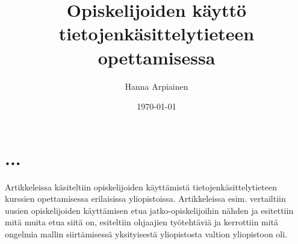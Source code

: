 \documentclass[finnish]{tktltiki2}
\title{﻿Opiskelijoiden käyttö tietojenkäsittelytieteen opettamisessa}
\author{Hanna Arpiainen}
\date{\today}
\theoremstyle{definition}
\theoremstyle{remark}
\begin{document}
\maketitle
\makeabstract

\tableofcontents
\newpage



\section{...}
Artikkeleissa käsiteltiin opiskelijoiden käyttämistä tietojenkäsittelytieteen kurssien opettamisessa erilaisissa yliopistoissa. Artikkeleissa esim. vertailtiin uusien opiskelijoiden käyttämisen etua jatko-opiskelijoihin nähden ja esitettiin mitä muita etua siitä on, esiteltiin ohjaajien työtehtäviä ja kerrottiin mitä ongelmia mallin siirtämisessä yksityisestä yliopistosta valtion yliopistoon oli.





\end{document}
